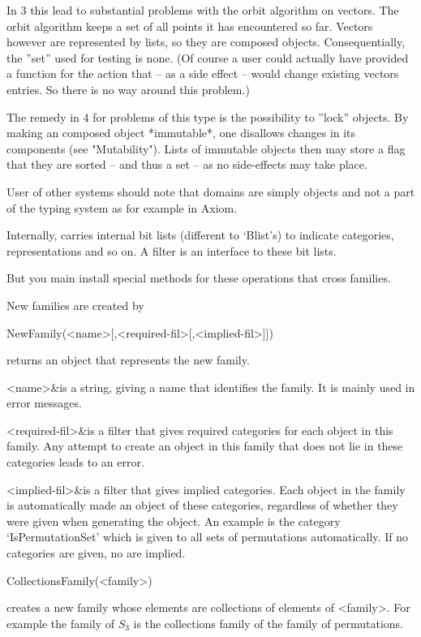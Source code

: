 In {\GAP} 3 this lead to substantial problems with the orbit algorithm on
vectors. The orbit algorithm keeps a set of all points it has encountered so
far. Vectors however are represented by lists, so they are composed objects.
Consequentially, the ''set'' used for testing is none. (Of course a
user could actually have provided a function for the action that
-- as a side effect -- would change existing vectors entries. So there is no
way around this problem.)

The remedy in {\GAP} 4 for problems of this type is the possibility to
''lock'' objects. By making an composed object *immutable*, one disallows
changes in its components (see "Mutability"). Lists of immutable objects
then may store a flag that they are sorted -- and thus a set -- as no
side-effects may take place.


\danger
User of other systems should note that domains
are simply objects and not a part of the typing system as for example in
Axiom.


\danger
Internally, {\GAP} carries internal bit lists (different to `Blist's) to
indicate categories, representations and so on. A filter is an interface to
these bit lists.


\danger
But you main install special methods for these operations that cross
families.


New families are created by 

\>NewFamily(<name>[,<required-fil>[,<implied-fil>]])

returns an object that represents the new family.

\beginitems
<name>&is a string, giving a name that identifies the family. It is mainly
used in error messages.

<required-fil>&is a filter that gives required categories for each object in
this family. Any attempt to create an object in this family that does not
lie in these categories leads to an error.

<implied-fil>&is a filter that gives implied categories.
Each object in the
family is automatically made an object of these categories, regardless of
whether they were given when generating the object. An example is the
category `IsPermutationSet' which is given to all sets of permutations
automatically.
If no categories are given, no are implied.
\enditems

\>CollectionsFamily(<family>)

creates a new family whose elements are collections of elements of <family>.
For example the family of $S_3$ is the collections family of the family of
permutations.

